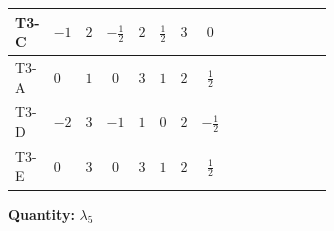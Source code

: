 \documentclass[8pt]{article}
\begin{document}
\begin{landscape}
\begin{longtable}{@{}llcccccc >{\raggedright\arraybackslash}p{0.21\linewidth} >{\raggedright\arraybackslash}p{0.21\linewidth} >{\raggedright\arraybackslash}p{0.21\linewidth}@{}}
\midrule
T3-C & $-1$ & $2$ & $-\frac{1}{2}$ & $2$ & $\frac{1}{2}$ & $3$ & $0$ & \scriptsize\adjustbox{max width=\linewidth}{$\begin{gathered} +2 {\lambda_{12}^{(1)}} {\lambda_5}\end{gathered}$} & \scriptsize\adjustbox{max width=\linewidth}{$\begin{gathered} +2 {\lambda_1} {\lambda_5}\end{gathered}$} & \scriptsize\adjustbox{max width=\linewidth}{$\begin{gathered} +4 {\lambda_{HS_1}^{(1)}} {\lambda_5}\end{gathered}$} \\
\midrule
T3-A & $0$ & $1$ & $0$ & $3$ & $1$ & $2$ & $\frac{1}{2}$ & \scriptsize\adjustbox{max width=\linewidth}{$\begin{gathered} +2 {\lambda_{12}^{(1)}} {\lambda_5}\end{gathered}$} & \scriptsize\adjustbox{max width=\linewidth}{$\begin{gathered} +2 {\lambda_1} {\lambda_5}\end{gathered}$} & \scriptsize\adjustbox{max width=\linewidth}{$\begin{gathered} +4 {\lambda_{HS_1}^{(1)}} {\lambda_5}\end{gathered}$} \\
\midrule
T3-D & $-2$ & $3$ & $-1$ & $1$ & $0$ & $2$ & $-\frac{1}{2}$ & \scriptsize\adjustbox{max width=\linewidth}{$\begin{gathered} +2 {\lambda_{12}^{(1)}} {\lambda_5}\end{gathered}$} & \scriptsize\adjustbox{max width=\linewidth}{$\begin{gathered} +2 {\lambda_1} {\lambda_5}\end{gathered}$} & \scriptsize\adjustbox{max width=\linewidth}{$\begin{gathered} +4 {\lambda_{HS_1}^{(1)}} {\lambda_5}\end{gathered}$} \\
\midrule
T3-E & $0$ & $3$ & $0$ & $3$ & $1$ & $2$ & $\frac{1}{2}$ & \scriptsize\adjustbox{max width=\linewidth}{$\begin{gathered} +2 {\lambda_{12}^{(1)}} {\lambda_5}\end{gathered}$} & \scriptsize\adjustbox{max width=\linewidth}{$\begin{gathered} +2 {\lambda_1} {\lambda_5}\end{gathered}$} & \scriptsize\adjustbox{max width=\linewidth}{$\begin{gathered} +4 {\lambda_{HS_1}^{(1)}} {\lambda_5}\end{gathered}$} \\
\midrule
\bottomrule
\end{longtable}
\clearpage
\noindent\textbf{Quantity: }$\lambda_5$\par\smallskip

\end{landscape}
\end{document}
